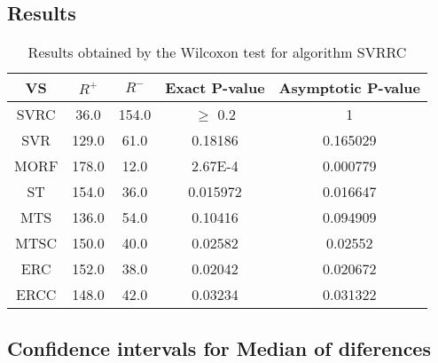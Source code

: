\documentclass[a4paper,10pt]{article}
\begin{document}
\subsection{Results}

\begin{table}[!htp]
\centering\small
\begin{tabular}{
|c|c|c|c|c|}
\hline
 VS & $R^{+}$ & $R^{-}$ & Exact P-value & Asymptotic P-value \\ \hline 
SVRC & 36.0 & 154.0 & $\geq$ 0.2 & 1\\ \hline 
SVR & 129.0 & 61.0 & 0.18186 & 0.165029\\ \hline 
MORF & 178.0 & 12.0 & 2.67E-4 & 0.000779\\ \hline 
ST & 154.0 & 36.0 & 0.015972 & 0.016647\\ \hline 
MTS & 136.0 & 54.0 & 0.10416 & 0.094909\\ \hline 
MTSC & 150.0 & 40.0 & 0.02582 & 0.02552\\ \hline 
ERC & 152.0 & 38.0 & 0.02042 & 0.020672\\ \hline 
ERCC & 148.0 & 42.0 & 0.03234 & 0.031322\\ \hline 

\end{tabular}
\caption{Results obtained by the Wilcoxon test for algorithm SVRRC}
\end{table}

\subsection{Confidence intervals for Median of diferences}
\end{document}
